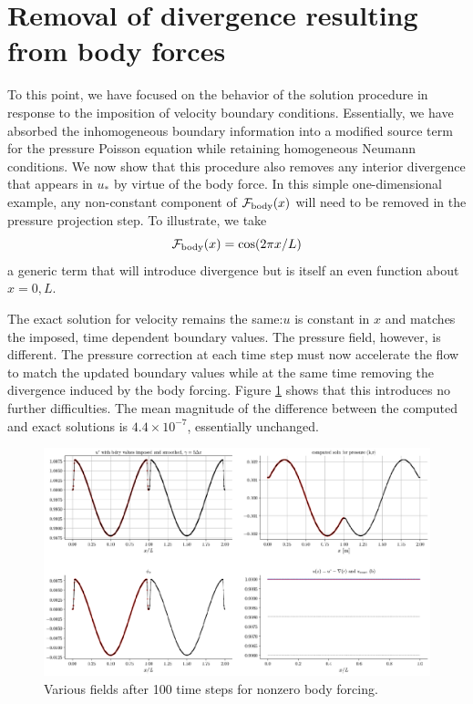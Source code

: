 \documentclass{jfm}
\begin{document}
\section{Removal of divergence resulting from body forces}
To this point, we have focused on the behavior of the solution procedure in response to the imposition of velocity boundary conditions. Essentially, we have absorbed the inhomogeneous boundary information
into a modified source term for the pressure Poisson equation while retaining homogeneous Neumann conditions. We now show that this procedure also removes any interior divergence that appears in $u_*$ by
virtue of the body force. In this simple one-dimensional example, any non-constant component of ${\mathcal F}_{\rm body}(x)$ will need to be removed in the pressure projection step. To illustrate, we take
\begin{equation}
{\mathcal F}_{\rm body}(x) =  \cos(2\pi x/L)
\end{equation}
a generic term that will introduce divergence but is itself an even function about $x=0,L$.

The  exact solution for velocity remains the same:$u$ is constant in $x$ and matches the imposed, time dependent boundary values.
The pressure field, however, is different. The pressure correction at each time step must now accelerate the flow to match the updated boundary values while at the same time removing the divergence induced by the body forcing.
Figure \ref{fig:composite} shows that this introduces no further difficulties. The  mean magnitude of the difference between the computed and exact solutions is  $4.4 \times 10^{-7}$, essentially unchanged.
 \begin{figure}
  \centerline{\includegraphics[width=1.0\textwidth]{FIGS/explicit_100BF/composite.eps}}
  \caption{Various fields after 100 time steps for nonzero body forcing.}
  \label{fig:composite}
\end{figure}
\end{document}
